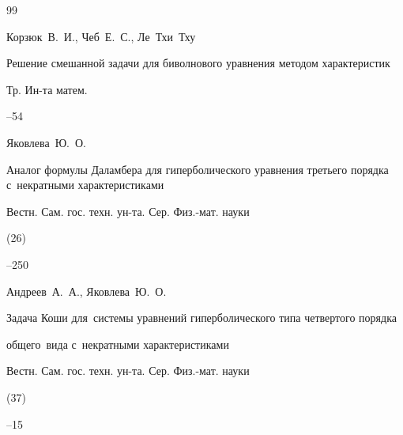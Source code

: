 \begin{thebibliography}{99}










\by Корзюк~В.~И., Чеб~Е.~С., Ле~Тхи~Тху

\paper Решение смешанной задачи для биволнового уравнения методом характеристик

\jour Тр. Ин-та матем.




--54






\by Яковлева~Ю.~О.

\paper Аналог формулы Даламбера для гиперболического уравнения третьего порядка с~некратными характеристиками

\jour Вестн. Сам. гос. техн. ун-та. Сер. Физ.-мат. науки


(26)

--250






\by Андреев~А.~А., Яковлева~Ю.~О. 

\paper Задача Коши для~системы уравнений гиперболического типа четвертого порядка

общего~вида с~некратными характеристиками

\jour Вестн. Сам. гос. техн. ун-та. Сер. Физ.-мат. науки


(37)

--15


\end{thebibliography}
